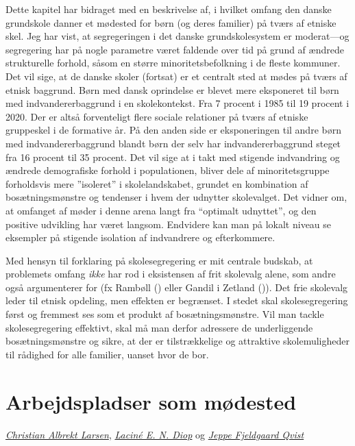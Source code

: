\documentclass[
]{book}
\begin{document}
Dette kapitel har bidraget med en beskrivelse af, i hvilket omfang den danske grundskole danner et mødested for børn (og deres familier) på tværs af etniske skel. Jeg har vist, at segregeringen i det danske grundskolesystem er moderat---og segregering har på nogle parametre været faldende over tid på grund af ændrede strukturelle forhold, såsom en større minoritetsbefolkning i de fleste kommuner. Det vil sige, at de danske skoler (fortsat) er et centralt sted at mødes på tværs af etnisk baggrund. Børn med dansk oprindelse er blevet mere eksponeret til børn med indvandererbaggrund i en skolekontekst. Fra 7 procent i 1985 til 19 procent i 2020. Der er altså forventeligt flere sociale relationer på tværs af etniske gruppeskel i de formative år. På den anden side er eksponeringen til andre børn med indvandererbaggrund blandt børn der selv har indvandererbaggrund steget fra 16 procent til 35 procent. Det vil sige at i takt med stigende indvandring og ændrede demografiske forhold i populationen, bliver dele af minoritetsgruppe forholdsvis mere ''isoleret'' i skolelandskabet, grundet en kombination af bosætningsmønstre og tendenser i hvem der udnytter skolevalget. Det vidner om, at omfanget af møder i denne arena langt fra ``optimalt udnyttet'', og den positive udvikling har været langsom. Endvidere kan man på lokalt niveau se eksempler på stigende isolation af indvandrere og efterkommere.

Med hensyn til forklaring på skolesegregering er mit centrale budskab, at problemets omfang \emph{ikke} har rod i eksistensen af frit skolevalg alene, som andre også argumenterer for (fx Rambøll () eller Gandil i Zetland ()). Det frie skolevalg leder til etnisk opdeling, men effekten er begrænset. I stedet skal skolesegregering først og fremmest ses som et produkt af bosætningsmønstre. Vil man tackle skolesegregering effektivt, skal må man derfor adressere de underliggende bosætningsmønstre og sikre, at der er tilstrækkelige og attraktive skolemuligheder til rådighed for alle familier, uanset hvor de bor.

\chapter{Arbejdspladser som mødested}\label{kap5}

\emph{\href{https://vbn.aau.dk/en/persons/albrekt}{Christian Albrekt Larsen}}, \emph{\href{https://vbn.aau.dk/en/persons/led}{Laciné E. N. Diop}} og \emph{\href{https://vbn.aau.dk/da/persons/jeppefl}{Jeppe Fjeldgaard Qvist}}
\end{document}
